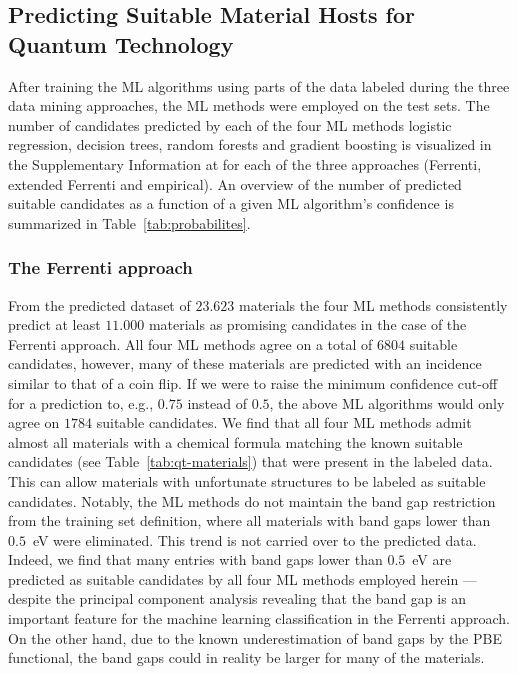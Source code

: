 \documentclass[superscriptaddress,unsortedaddress,
 amsmath,amssymb,
 aps,
]{revtex4-2}
\begin{document}
\subsection*{Predicting Suitable Material Hosts for Quantum Technology} 
After training the ML algorithms using parts of the data labeled during the three data mining approaches, the ML methods were employed on the test sets. 
The number of candidates predicted by each of the four ML methods logistic regression, decision trees, random forests and gradient boosting is visualized in the Supplementary Information at \cite{supplementary} for each of the three approaches (Ferrenti, extended Ferrenti and empirical). 
An overview of the number of predicted suitable candidates as a function of a given ML algorithm's confidence is summarized in  Table~\ref{tab:probabilites}. 

\subsubsection*{The Ferrenti approach}

From the predicted dataset of $23.623$ materials 
the four ML methods consistently predict at least $11.000$ materials as promising candidates in the case of the Ferrenti approach. All four ML methods agree on a total of $6804$ suitable candidates, however, many of these materials are predicted with an incidence similar to that of a coin flip. If we were to raise the minimum confidence cut-off for a prediction to, e.g., $0.75$ instead of $0.5$, the above ML algorithms would only agree on $1784$ suitable candidates. 
We find that all four ML methods admit almost all materials with a chemical formula matching the known suitable candidates (see Table~\ref{tab:qt-materials}) that were present in the labeled data. This can allow materials with unfortunate structures to be labeled as suitable candidates. Notably, the ML methods do not maintain the band gap restriction from the training set definition, where all materials with band gaps lower than $0.5$~eV were eliminated. 
This trend is not carried over to the predicted data. Indeed, we find that many entries with band gaps lower than $0.5$~eV are predicted as suitable candidates by all four ML methods employed herein 
--- despite the principal component analysis revealing that the band gap is an important feature for the machine learning classification in the Ferrenti approach.  
On the other hand, due to the known  underestimation of band gaps by the PBE  functional, the band gaps could in reality be larger for many of the materials. 
\end{document}
